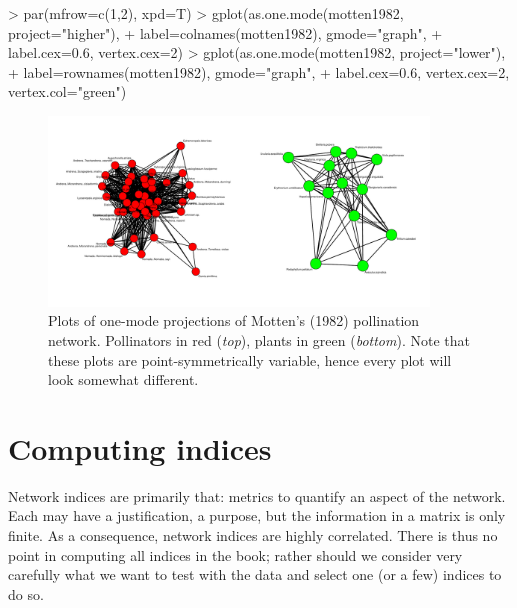 \documentclass[a4paper, 11pt]{article}
\begin{document}
\begin{Schunk}
\begin{Sinput}
> par(mfrow=c(1,2), xpd=T)
> gplot(as.one.mode(motten1982, project="higher"), 
+  label=colnames(motten1982), gmode="graph", 
+ label.cex=0.6, vertex.cex=2)
> gplot(as.one.mode(motten1982, project="lower"), 
+ 	label=rownames(motten1982), gmode="graph", 
+ 	label.cex=0.6, vertex.cex=2, vertex.col="green")
\end{Sinput}
\end{Schunk}
%
%
\begin{figure}
\centering
	\includegraphics[width=0.9\textwidth]{figures/motten1982_gplot}
	\caption{Plots of one-mode projections of Motten's (1982) pollination network. Pollinators in red (\emph{top}), plants in green (\emph{bottom}). Note that these plots are point-symmetrically variable, hence every plot will look somewhat different.}
	\label{fig:Amottengplot}
\end{figure}


\clearpage

\section{Computing indices} %
Network indices are primarily that: metrics to quantify an aspect of the network. Each may have a justification, a purpose, but the information in a matrix is only finite. As a consequence, network indices are highly correlated. There is thus no point in computing all indices in the book; rather should we consider very carefully what we want to test with the data and select one (or a few) indices to do so.
\end{document}
